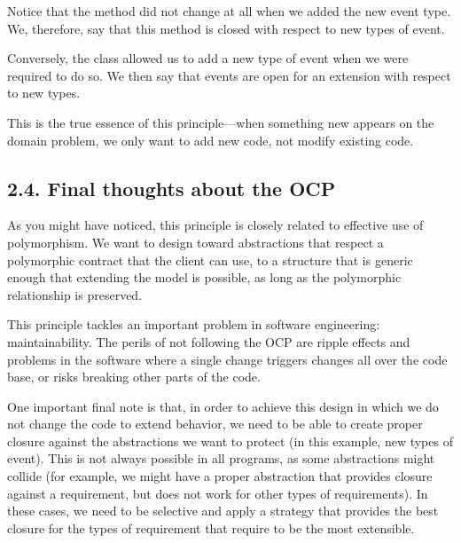 \documentclass[a4paper,10pt,english]{sphinxmanual}
\begin{document}
\begin{sphinxVerbatim}[commandchars=\\\{\}]
    
\end{sphinxVerbatim}

Notice that the  method did not change at all when
we added the new event type. We, therefore, say that this method is closed with respect to
new types of event.

Conversely, the  class allowed us to add a new type of event when we were required
to do so. We then say that events are open for an extension with respect to new types.

This is the true essence of this principle—when something new appears on the domain
problem, we only want to add new code, not modify existing code.


\subsection{2.4. Final thoughts about the OCP}
\label{\detokenize{chapters/4_solid_principles/index:final-thoughts-about-the-ocp}}
As you might have noticed, this principle is closely related to effective use of
polymorphism. We want to design toward abstractions that respect a polymorphic contract
that the client can use, to a structure that is generic enough that extending the model is
possible, as long as the polymorphic relationship is preserved.

This principle tackles an important problem in software engineering: maintainability. The
perils of not following the OCP are ripple effects and problems in the software where a
single change triggers changes all over the code base, or risks breaking other parts of the
code.

One important final note is that, in order to achieve this design in which we do not change
the code to extend behavior, we need to be able to create proper closure against the
abstractions we want to protect (in this example, new types of event). This is not always
possible in all programs, as some abstractions might collide (for example, we might have a
proper abstraction that provides closure against a requirement, but does not work for other
types of requirements). In these cases, we need to be selective and apply a strategy that
provides the best closure for the types of requirement that require to be the most extensible.
\end{document}
